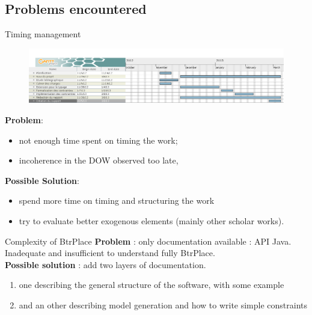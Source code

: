 \documentclass{beamer}
\begin{document}
\subsection{Problems encountered}
\begin{frame}{Timing management}
\begin{figure}[!ht]
	\includegraphics[scale=.2]{imgs/gantt2.png}
\end{figure}
\textbf{Problem}:
\begin{itemize}
	\item not enough time spent on timing the work; 
	\item incoherence in the DOW observed too late, %
\end{itemize}
\pause\textbf{Possible Solution}:
\begin{itemize}
	\item spend more time on timing and structuring the work %
	\item try to evaluate better exogenous elements (mainly other scholar works).
\end{itemize}
\end{frame}

\begin{frame}{Complexity of BtrPlace}
\textbf{Problem} : only documentation available : API Java.
Inadequate and insufficient to understand fully BtrPlace.\\
\pause\textbf{Possible solution} : add two layers of documentation.
\begin{enumerate}
	\item one describing the general structure of the software, with
		some example
	\item and an other describing model generation and how to
		write simple constraints
\end{enumerate}
\end{frame}
\end{document}
